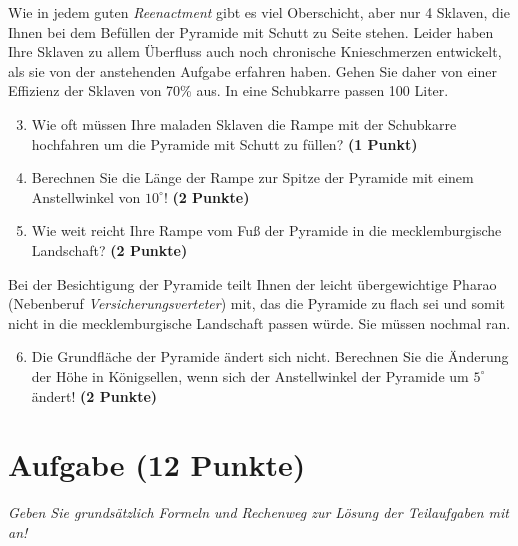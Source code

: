 \documentclass[a4paper, 10pt]{scrartcl}\usepackage[]{graphicx}\usepackage[]{xcolor}
\begin{document}
Wie in jedem guten \textit{Reenactment} gibt es viel Oberschicht, aber nur
4 Sklaven, die Ihnen bei dem Bef{\"u}llen der Pyramide mit Schutt
zu Seite stehen. Leider haben Ihre Sklaven zu allem {\"U}berfluss auch noch
chronische Knieschmerzen entwickelt, als sie von der
anstehenden Aufgabe erfahren haben. Gehen Sie daher von einer Effizienz der
Sklaven von 70\% aus. In eine Schubkarre passen
100 Liter.

\begin{enumerate}
  \setcounter{enumi}{2}
\item Wie oft m{\"u}ssen Ihre maladen Sklaven die Rampe mit der Schubkarre
  hochfahren um die Pyramide mit Schutt zu f{\"u}llen? \textbf{(1 Punkt)}
\item Berechnen Sie die L{\"a}nge der Rampe zur Spitze der Pyramide mit einem
  Anstellwinkel von $10^\circ$! \textbf{(2 Punkte)}
\item Wie weit reicht Ihre Rampe vom Fu{\ss} der Pyramide in die mecklemburgische
  Landschaft?  \textbf{(2 Punkte)}
\end{enumerate}

Bei der Besichtigung der Pyramide teilt Ihnen der leicht {\"u}bergewichtige
Pharao (Nebenberuf \textit{Versicherungsverteter}) mit, das die Pyramide zu
flach sei und somit nicht in die mecklemburgische Landschaft passen
w{\"u}rde. Sie m{\"u}ssen nochmal ran.

\begin{enumerate}
  \setcounter{enumi}{5}
\item Die Grundfl{\"a}che der Pyramide {\"a}ndert sich nicht. Berechnen Sie die
  {\"A}nderung der H{\"o}he in K{\"o}nigsellen, wenn sich der Anstellwinkel der
  Pyramide um $5^\circ$ {\"a}ndert!  \textbf{(2 Punkte)}
\end{enumerate}



\clearpage\null 
\clearpage

\section{Aufgabe \hfill (12 Punkte)}

\textit{Geben Sie grunds{\"a}tzlich Formeln und Rechenweg zur L{\"o}sung der
  Teilaufgaben mit an!} \\[1Ex]
\end{document}
